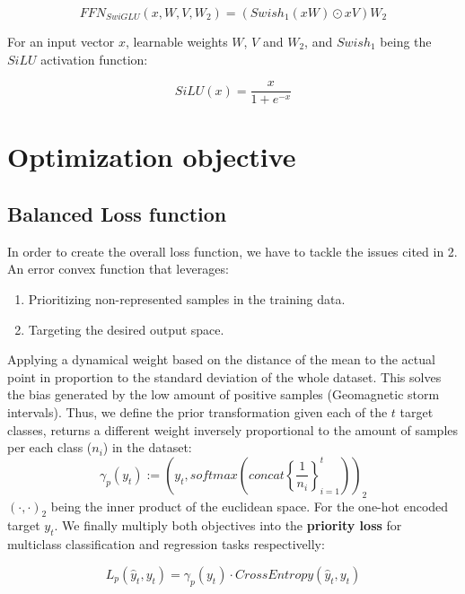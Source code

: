 \documentclass{article}
\begin{document}
\begin{equation}
    FFN_{SwiGLU} (x, W, V, W_2) = (Swish_1(xW) \odot xV)W_2
\end{equation}

For an input vector $x$, learnable weights $W$, $V$ and $W_2$, and $Swish_1$ being the $SiLU$ activation function:

\begin{equation}
    SiLU(x) = \frac{x}{1 + e^{-x}}
\end{equation}

\section{Optimization objective}

\subsection{Balanced Loss function}

In order to create the overall loss function, we have to tackle the issues cited in {2}. An error convex function that leverages:
\begin{enumerate}
    \item Prioritizing non-represented samples in the training data.
    \item Targeting the desired output space.
\end{enumerate}

Applying a dynamical weight based on the distance of the mean to the actual point in proportion to the standard deviation of the whole dataset. This solves the bias generated by the low amount of positive samples (Geomagnetic storm intervals). Thus, we define the prior transformation given each of the $t$ target classes, returns a different weight inversely proportional to the amount of samples per each class ($n_i$) in the dataset:
\begin{equation}
    \gamma_p(y_t) := \left(y_t, softmax\left(concat\left\{\frac{1}{n_i}\right\}_{i=1}^t\right)\right)_2
\end{equation}
$(\cdot, \cdot)_2$ being the inner product of the euclidean space. For the one-hot encoded target $y_t$. We finally multiply both objectives into the \textbf{priority loss} for multiclass classification and regression tasks respectivelly:

\begin{equation}
L_{p}(\hat{y}_t, y_t) = \gamma_{p}(y_t) \cdot CrossEntropy(\hat{y}_t, y_t)
    \end{equation}
\end{document}
